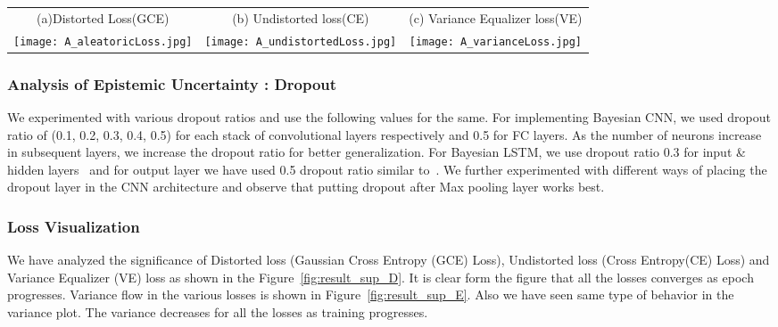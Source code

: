 \documentclass[review]{elsarticle}
\begin{document}
\begin{figure*}[ht]
	\small
	\centering
	\begin{tabular}[b]{ c  c  c}
		(a)Distorted Loss(GCE) & (b) Undistorted loss(CE) & (c) Variance Equalizer loss(VE) \\ 
		\texttt{[image: A\_aleatoricLoss.jpg]}
		& \texttt{[image: A\_undistortedLoss.jpg]}
		& \texttt{[image: A\_varianceLoss.jpg]}
	\end{tabular}
	\vspace{-2.2em}
	\caption{We have shown the variance  flow plots over Epochs. This shows role of different type of loss over epoch. from the plot we observed that variance is decreasing as it goes through more and more epochs.}
	\label{fig:result_sup_E}
\end{figure*}
\subsubsection{Analysis of Epistemic Uncertainty : Dropout}\label{dropout_variants}


We experimented with various dropout ratios and use the following values for the same.
For implementing Bayesian CNN, we used dropout ratio 
of (0.1, 0.2, 0.3, 0.4, 0.5) for each stack of convolutional layers respectively and 0.5 for FC layers. 
As the number of neurons increase in subsequent layers, we increase the dropout ratio for better generalization. For Bayesian LSTM, we use dropout ratio 0.3 for input \& hidden layers~\cite{Hochreiter_NC1997} and for output layer we have used 0.5 dropout ratio similar to~\cite{Gal_NIPS2016}. We further experimented with different ways of placing the dropout layer in the CNN architecture and observe that putting dropout after Max pooling layer works best.




\subsubsection{Loss Visualization}\label{Loss}
We have analyzed the significance of Distorted loss (Gaussian Cross Entropy (GCE) Loss), Undistorted loss (Cross Entropy(CE) Loss) and  Variance Equalizer (VE) loss as shown in the Figure~\ref{fig:result_sup_D}. It is clear form the figure that all the losses converges as epoch progresses.  Variance flow in the various losses is shown in Figure~\ref{fig:result_sup_E}. Also we have seen same type of behavior in the variance plot. The variance decreases for all the losses as training progresses. 
\end{document}
